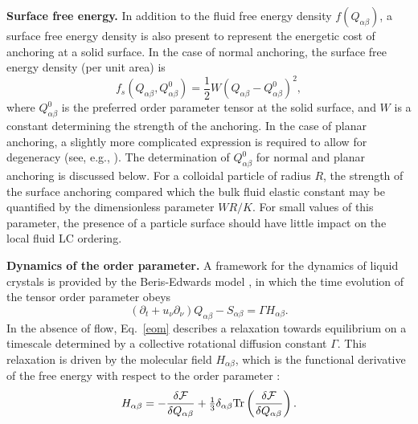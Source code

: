 \documentclass[12pt]{article}
\begin{document}
\medskip
\noindent
\textbf{Surface free energy.}
In addition to the fluid free energy density $f(Q_{\alpha\beta})$, a surface
free energy density is also present to represent the energetic cost of
anchoring at a solid surface.
In the case of normal anchoring, the surface free energy
density (per unit area) is
\begin{equation}
f_s(Q_{\alpha\beta}, Q^0_{\alpha\beta})
= {\textstyle \frac{1}{2}}W(Q_{\alpha\beta} - Q^0_{\alpha\beta})^2,
\end{equation}
where $Q^0_{\alpha\beta}$ is the preferred order
parameter tensor at the solid surface, and $W$ is a constant determining
the strength of the anchoring. In the case of planar anchoring, a slightly
more complicated expression is required to allow for degeneracy
(see, e.g., \cite{fournier2005}).
The determination of $Q^0_{\alpha\beta}$ for normal and planar anchoring is
discussed below. For a colloidal particle of radius $R$, the strength of
the surface
anchoring compared which the bulk fluid elastic constant may be quantified
by the dimensionless parameter $WR/K$. For small values of this parameter,
the presence of a particle surface should have little impact on the local
fluid LC ordering.

\medskip
\noindent
\textbf{Dynamics of the order parameter.}
A framework for the dynamics of liquid crystals is provided by the 
Beris-Edwards model \cite{beris}, in which the time evolution of the
tensor order parameter obeys
\begin{equation}
\label{eom}
\left(\partial_t+ u_\nu \partial_\nu \right) Q_{\alpha\beta} - S_{\alpha\beta}
= \mathit{\Gamma} H_{\alpha\beta}.
\end{equation}
In the absence of flow, Eq.~\ref{eom} describes a relaxation towards
equilibrium on a timescale determined by a collective rotational diffusion 
constant $\mathit{\Gamma}$. This relaxation is driven by the molecular field
$H_{\alpha\beta}$, which is the functional derivative of the free energy
with respect to the order parameter \cite{beris}:
\begin{equation}
H_{\alpha\beta} = -\frac{\delta {\cal F}} {\delta Q_{\alpha\beta}} 
+ {\textstyle \frac{1}{3}} \delta_{\alpha\beta} 
\mathrm{Tr}\left(\frac{\delta {\cal F}}{\delta Q_{\alpha\beta}}\right).
\end{equation}
\end{document}

